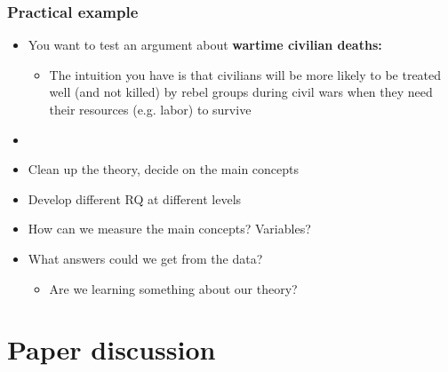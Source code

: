 \documentclass[aspectratio=43]{beamer}
\begin{document}
\begin{frame}
\frametitle{Practical example}
\centering

\begin{itemize}
  \item You want to test an argument about \textbf{wartime civilian deaths:}
  \begin{itemize}
    \item The intuition you have is that civilians will be more likely to be treated well (and not killed) by rebel groups during civil wars when they need their resources (e.g. labor) to survive
  \end{itemize}
  \item[]
  \item Clean up the theory, decide on the main concepts
  \item Develop different RQ at different levels
  \item How can we measure the main concepts? Variables?
  \item What answers could we get from the data?
    \begin{itemize}
      \item Are we learning something about our theory?
    \end{itemize}
\end{itemize}

\end{frame}

\section{Paper discussion}


\end{document}
